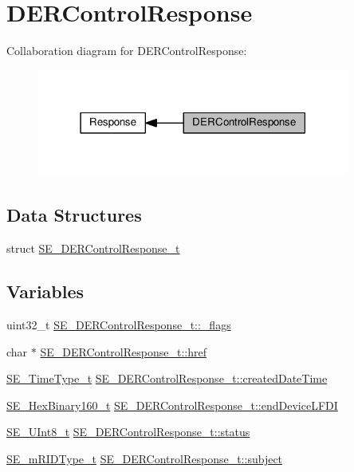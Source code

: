 \hypertarget{group__DERControlResponse}{}\section{D\+E\+R\+Control\+Response}
\label{group__DERControlResponse}
Collaboration diagram for D\+E\+R\+Control\+Response\+:\nopagebreak
\begin{figure}[H]
\begin{center}
\leavevmode
\includegraphics[width=291pt]{group__DERControlResponse}
\end{center}
\end{figure}
\subsection*{Data Structures}
\begin{DoxyCompactItemize}
\item 
struct \hyperlink{structSE__DERControlResponse__t}{S\+E\+\_\+\+D\+E\+R\+Control\+Response\+\_\+t}
\end{DoxyCompactItemize}
\subsection*{Variables}
\begin{DoxyCompactItemize}
\item 
uint32\+\_\+t \hyperlink{group__DERControlResponse_gae6670b4ecc86324d6b218d9761fdae53}{S\+E\+\_\+\+D\+E\+R\+Control\+Response\+\_\+t\+::\+\_\+flags}
\item 
char $\ast$ \hyperlink{group__DERControlResponse_ga8e14c284b0b26e7571561c82d2a341f3}{S\+E\+\_\+\+D\+E\+R\+Control\+Response\+\_\+t\+::href}
\item 
\hyperlink{group__TimeType_ga6fba87a5b57829b4ff3f0e7638156682}{S\+E\+\_\+\+Time\+Type\+\_\+t} \hyperlink{group__DERControlResponse_ga0914ccbb8b4cd078cbc81028492b4f32}{S\+E\+\_\+\+D\+E\+R\+Control\+Response\+\_\+t\+::created\+Date\+Time}
\item 
\hyperlink{group__HexBinary160_ga92b92aa55555bdb75f3a59060f2c1632}{S\+E\+\_\+\+Hex\+Binary160\+\_\+t} \hyperlink{group__DERControlResponse_gaacc63347ab9a7861f4a46bd2b8d9106d}{S\+E\+\_\+\+D\+E\+R\+Control\+Response\+\_\+t\+::end\+Device\+L\+F\+DI}
\item 
\hyperlink{group__UInt8_gaf7c365a1acfe204e3a67c16ed44572f5}{S\+E\+\_\+\+U\+Int8\+\_\+t} \hyperlink{group__DERControlResponse_ga2fe7afc8789860b2df5e415466c0ba09}{S\+E\+\_\+\+D\+E\+R\+Control\+Response\+\_\+t\+::status}
\item 
\hyperlink{group__mRIDType_gac74622112f3a388a2851b2289963ba5e}{S\+E\+\_\+m\+R\+I\+D\+Type\+\_\+t} \hyperlink{group__DERControlResponse_ga688f4633018b16078b75d07fe9cf8b8b}{S\+E\+\_\+\+D\+E\+R\+Control\+Response\+\_\+t\+::subject}
\end{DoxyCompactItemize}


